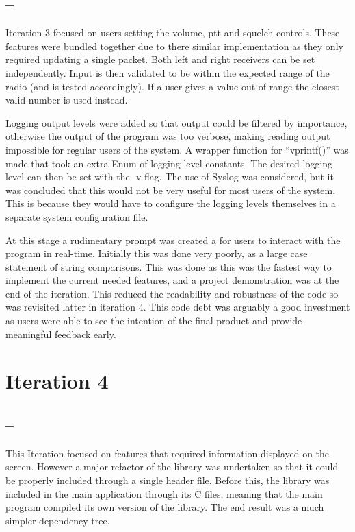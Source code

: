 \subsection*{ -- }
Iteration 3 focused on users setting the volume, \gls{ptt} and \gls{squelch} controls. These features were bundled together due to there similar implementation as they only required updating a single packet. Both left and right receivers can be set independently. Input is then validated to be within the expected range of the radio (and is tested accordingly). If a user gives a value out of range the closest valid number is used instead.

Logging output levels were added so that output could be filtered by importance, otherwise the output of the program was too verbose, making reading output impossible for regular users of the system. A wrapper function for ``vprintf()'' was made that took an extra Enum of logging level constants. The desired logging level can then be set with the -v flag. The use of Syslog was considered, but it was concluded that this would not be very useful for most users of the system. This is because they would have to configure the logging levels themselves in a separate system configuration file.

At this stage a rudimentary prompt was created a for users to interact with the program in real-time. Initially this was done very poorly, as a large case statement of string comparisons. This was done as this was the fastest way to implement the current needed features, and a project demonstration was at the end of the iteration. This reduced the readability and robustness of the code so was revisited latter in iteration 4. This code debt was arguably a good investment as users were able to see the intention of the final product and provide meaningful feedback early. 

\section{Iteration 4}
\subsection*{ -- }

This Iteration focused on features that required information displayed on the screen. However a major refactor of the library was undertaken so that it could be properly included through a single header file. Before this, the library was included in the main application through its C files, meaning that the main program compiled its own version of the library. The end result was a much simpler dependency tree.

